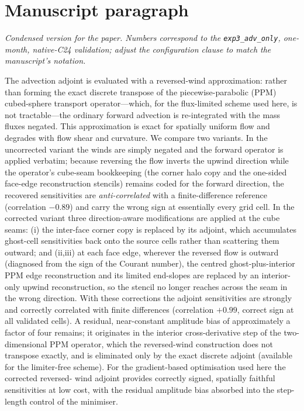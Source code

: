 \documentclass[11pt]{article}
\newcommand{\code}[1]{\texttt{#1}}
\begin{document}
\section{Manuscript paragraph}
\label{sec:manuscript}

\noindent\emph{Condensed version for the paper. Numbers correspond to the
\code{exp3\_adv\_only}, one-month, native-C24 validation; adjust the
configuration clause to match the manuscript's notation.}

\bigskip

The advection adjoint is evaluated with a reversed-wind approximation: rather
than forming the exact discrete transpose of the piecewise-parabolic (PPM)
cubed-sphere transport operator---which, for the flux-limited scheme used here,
is not tractable---the ordinary forward advection is re-integrated with the mass
fluxes negated. This approximation is exact for spatially uniform flow and
degrades with flow shear and curvature. We compare two variants. In the
uncorrected variant the winds are simply negated and the forward operator is
applied verbatim; because reversing the flow inverts the upwind direction while
the operator's cube-seam bookkeeping (the corner halo copy and the one-sided
face-edge reconstruction stencils) remains coded for the forward direction, the
recovered sensitivities are \emph{anti-correlated} with a finite-difference
reference (correlation $-0.89$) and carry the wrong sign at essentially every
grid cell. In the corrected variant three direction-aware modifications are
applied at the cube seams: (i) the inter-face corner copy is replaced by its
adjoint, which accumulates ghost-cell sensitivities back onto the source cells
rather than scattering them outward; and (ii,iii) at each face edge, wherever the
reversed flow is outward (diagnosed from the sign of the Courant number), the
centred ghost-plus-interior PPM edge reconstruction and its limited end-slopes
are replaced by an interior-only upwind reconstruction, so the stencil no longer
reaches across the seam in the wrong direction. With these corrections the
adjoint sensitivities are strongly and correctly correlated with finite
differences (correlation $+0.99$, correct sign at all validated cells). A
residual, near-constant amplitude bias of approximately a factor of four remains;
it originates in the interior cross-derivative step of the two-dimensional PPM
operator, which the reversed-wind construction does not transpose exactly, and is
eliminated only by the exact discrete adjoint (available for the limiter-free
scheme). For the gradient-based optimisation used here the corrected reversed-
wind adjoint provides correctly signed, spatially faithful sensitivities at
low cost, with the residual amplitude bias absorbed into the step-length control
of the minimiser.
\end{document}
